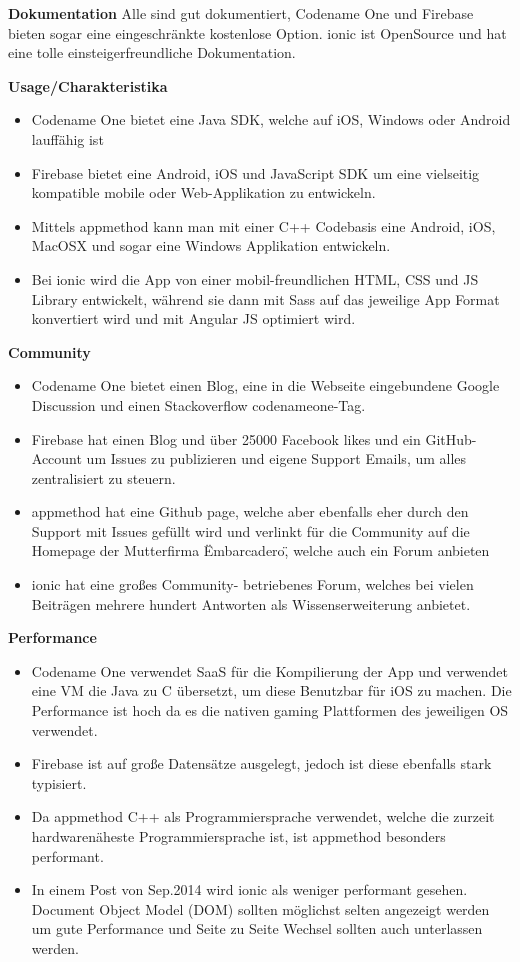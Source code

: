 \textbf{Dokumentation}
Alle sind gut dokumentiert, Codename One und Firebase bieten sogar eine eingeschränkte kostenlose Option.
ionic ist OpenSource und hat eine tolle einsteigerfreundliche Dokumentation.

\textbf{Usage/Charakteristika}
\begin{itemize}
\item Codename One bietet eine Java SDK, welche auf iOS, Windows oder Android lauffähig ist
\item Firebase bietet eine Android, iOS und JavaScript SDK um eine vielseitig kompatible mobile oder Web-Applikation zu entwickeln. 
\item Mittels appmethod kann man mit einer C++ Codebasis eine Android, iOS, MacOSX und sogar eine Windows Applikation entwickeln.
\item Bei ionic wird die App von einer mobil-freundlichen HTML, CSS und JS Library entwickelt, während sie dann mit Sass auf das jeweilige App Format konvertiert wird und mit Angular JS optimiert wird. 
\end{itemize}

\textbf{Community}
\begin{itemize}
\item Codename One bietet einen Blog, eine in die Webseite eingebundene Google Discussion und einen Stackoverflow codenameone-Tag.
\item Firebase hat einen Blog und über 25000 Facebook likes und ein GitHub-Account um Issues zu publizieren und eigene Support Emails, um alles zentralisiert zu steuern. 
\item appmethod hat eine Github page, welche aber ebenfalls eher durch den Support mit Issues gefüllt wird und verlinkt für die Community auf die Homepage der Mutterfirma \"Embarcadero\", welche auch ein Forum anbieten
\item ionic hat eine großes Community- betriebenes Forum, welches bei vielen Beiträgen mehrere hundert Antworten als Wissenserweiterung anbietet.
\end{itemize}

\textbf{Performance}
\begin{itemize}
\item Codename One verwendet SaaS für die Kompilierung der App und verwendet eine VM die Java zu C übersetzt, um diese Benutzbar für iOS zu machen. Die Performance ist hoch da es die nativen gaming Plattformen des jeweiligen OS verwendet. 
\item Firebase ist auf große Datensätze ausgelegt, jedoch ist diese ebenfalls stark typisiert.
\item Da appmethod C++ als Programmiersprache verwendet, welche die zurzeit hardwarenäheste Programmiersprache ist, ist appmethod besonders performant.
\item In einem Post von Sep.2014 wird ionic als weniger performant gesehen. Document Object Model (DOM) sollten möglichst selten angezeigt werden um gute Performance und Seite zu Seite Wechsel sollten auch unterlassen werden.
\end{itemize}

